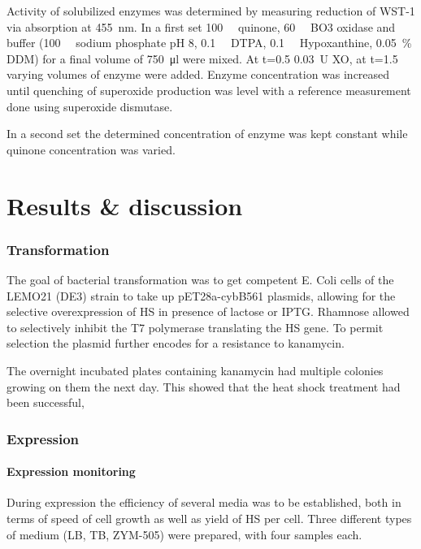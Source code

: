 \documentclass[a4paper,overfullrule=true]{scrartcl}
\begin{document}
Activity of solubilized enzymes was determined by measuring reduction of WST-1
via absorption at \SI{455}{\nm}. In a first set \SI{100}{\micro\Molar} quinone,
\SI{60}{\nano\Molar} BO3 oxidase and buffer (\SI{100}{\milli\Molar} sodium
phosphate pH 8, \SI{0.1}{\milli\Molar} DTPA, \SI{0.1}{\milli\Molar}
Hypoxanthine, \SI{0.05}{\percent} DDM) for a final volume of \SI{750}{\ul} were
mixed. At t=\SI{0.5}{\min} \SI{0.03}{U} XO, at t=\SI{1.5}{\min} varying volumes
of enzyme were added. Enzyme concentration was increased until quenching of
superoxide production was level with a reference measurement done using
superoxide dismutase.

In a second set the determined concentration of enzyme was kept constant while
quinone concentration was varied.

\newpage
\part*{Results \& discussion}

\section{Transformation}

The goal of bacterial transformation was to get competent E. Coli cells of the
LEMO21 (DE3) strain to take up pET28a-cybB561 plasmids, allowing for the
selective overexpression of HS in presence of lactose or IPTG. Rhamnose allowed
to selectively inhibit the T7 polymerase translating the HS gene.
\cite{memstar} To permit selection the plasmid further encodes for a resistance
to kanamycin.

The overnight incubated plates containing kanamycin had multiple colonies
growing on them the next day. This showed that the heat shock treatment had
been successful,

\section{Expression}

\subsection{Expression monitoring}

During expression the efficiency of several media was to be established, both
in terms of speed of cell growth as well as yield of HS per cell. Three
different types of medium (LB, TB, ZYM-505) were prepared, with four samples
each.
\end{document}
